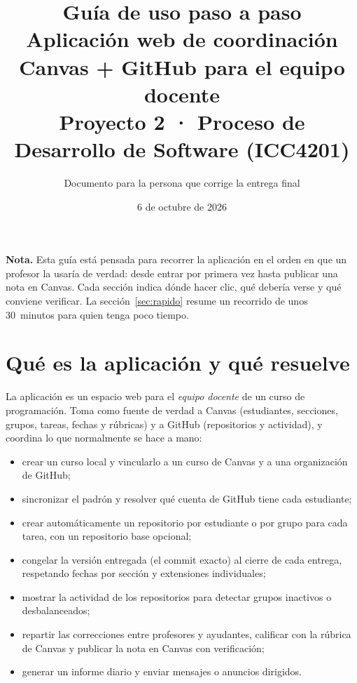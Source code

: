 \documentclass[11pt,a4paper]{article}
\title{\vspace{-1cm}\textbf{Guía de uso paso a paso}\\[4pt]
\large Aplicación web de coordinación Canvas + GitHub para el equipo docente\\[2pt]
\normalsize Proyecto 2 · Proceso de Desarrollo de Software (ICC4201)}
\author{Documento para la persona que corrige la entrega final}
\date{6 de octubre de 2026}
\newenvironment{nota}
  {\def\FrameCommand{\fcolorbox{ambar}{ambarfondo}}\MakeFramed{\advance\hsize-\width\FrameRestore}\noindent\textbf{\textcolor{ambar}{Nota.}} }
  {\endMakeFramed}
\begin{document}
\maketitle
\thispagestyle{fancy}

\begin{nota}
Esta guía está pensada para recorrer la aplicación en el orden en que un profesor la usaría de verdad: desde entrar por primera vez hasta publicar una nota en Canvas. Cada sección indica dónde hacer clic, qué debería verse y qué conviene verificar. La sección~\ref{sec:rapido} resume un recorrido de unos 30~minutos para quien tenga poco tiempo.
\end{nota}

\tableofcontents
\newpage

\section{Qué es la aplicación y qué resuelve}

La aplicación es un espacio web para el \emph{equipo docente} de un curso de programación. Toma como fuente de verdad a Canvas (estudiantes, secciones, grupos, tareas, fechas y rúbricas) y a GitHub (repositorios y actividad), y coordina lo que normalmente se hace a mano:

\begin{itemize}
  \item crear un curso local y vincularlo a un curso de Canvas y a una organización de GitHub;
  \item sincronizar el padrón y resolver qué cuenta de GitHub tiene cada estudiante;
  \item crear automáticamente un repositorio por estudiante o por grupo para cada tarea, con un repositorio base opcional;
  \item congelar la versión entregada (el commit exacto) al cierre de cada entrega, respetando fechas por sección y extensiones individuales;
  \item mostrar la actividad de los repositorios para detectar grupos inactivos o desbalanceados;
  \item repartir las correcciones entre profesores y ayudantes, calificar con la rúbrica de Canvas y publicar la nota en Canvas con verificación;
  \item generar un informe diario y enviar mensajes o anuncios dirigidos.
\end{itemize}
\end{document}
